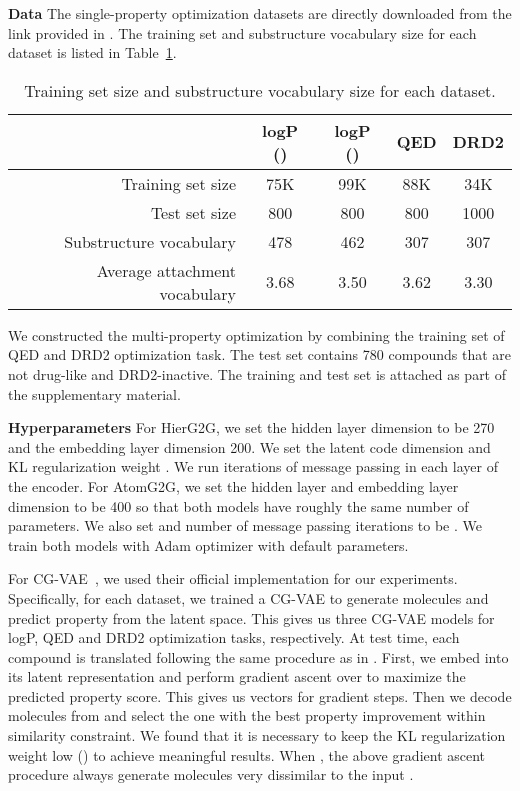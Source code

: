 \documentclass{article} \usepackage{iclr2020_conference,times}
\begin{document}
\textbf{Data } The single-property optimization datasets are directly downloaded from the link provided in \citet{jin2018learning}. The training set and substructure vocabulary size for each dataset is listed in Table~\ref{tab:data}.
\begin{table}[ht]
    \centering
    \begin{tabular}{rcccc}
        \hline
        & logP () & logP () & QED & DRD2 \Tstrut\Bstrut \\
        \hline
        Training set size & 75K & 99K & 88K & 34K \Tstrut\Bstrut \\
        Test set size & 800 & 800 & 800 & 1000 \Tstrut\Bstrut \\
        Substructure vocabulary  & 478 & 462 & 307 & 307 \Tstrut\Bstrut \\
        Average attachment vocabulary  & 3.68 & 3.50 & 3.62 & 3.30 \Tstrut\Bstrut \\ \hline
    \end{tabular}
    \caption{Training set size and substructure vocabulary size for each dataset.}
    \label{tab:data}
\end{table}
We constructed the multi-property optimization by combining the training set of QED and DRD2 optimization task. The test set contains 780 compounds that are not drug-like and DRD2-inactive. The training and test set is attached as part of the supplementary material.

\textbf{Hyperparameters } For HierG2G, we set the hidden layer dimension to be 270 and the embedding layer dimension 200. We set the latent code dimension  and KL regularization weight . We run  iterations of message passing in each layer of the encoder. 
For AtomG2G, we set the hidden layer and embedding layer dimension to be 400 so that both models have roughly the same number of parameters. We also set  and number of message passing iterations to be . We train both models with Adam optimizer with default parameters.

For CG-VAE~\citep{liu2018constrained}, we used their official implementation for our experiments. Specifically, for each dataset, we trained a CG-VAE to generate molecules and predict property from the latent space. This gives us three CG-VAE models for logP, QED and DRD2 optimization tasks, respectively. 
At test time, each compound  is translated following the same procedure as in \citet{jin2018junction}. First, we embed  into its latent representation  and perform gradient ascent over  to maximize the predicted property score. This gives us  vectors for  gradient steps. Then we decode  molecules from  and select the one with the best property improvement within similarity constraint.
We found that it is necessary to keep the KL regularization weight low () to achieve meaningful results. When , the above gradient ascent procedure always generate molecules very dissimilar to the input .
\end{document}
